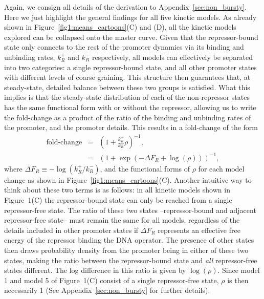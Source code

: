 Again, we consign all details of the derivation to
Appendix~\ref{sec:non_bursty}. Here we just highlight the general findings for
all five kinetic models. As already shown in Figure~\ref{fig1:means_cartoons}(C)
and (D), all the kinetic models explored can be collapsed onto the master curve.
Given that the repressor-bound state only connects to the rest of the promoter
dynamics via its binding and unbinding rates, $k_R^+$ and $k_R^-$ respectively,
all models can effectively be separated into two categories: a single
repressor-bound state, and all other promoter states with different levels of
coarse graining. This structure then guarantees that, at steady-state, detailed
balance between these two groups is satisfied. What this implies is that the
steady-state distribution of each of the non-repressor states has the same
functional form with or without the repressor, allowing us to write the
fold-change as a product of the ratio of the binding and unbinding rates of the
promoter, and the promoter details. This results in a fold-change of the form
\begin{eqnarray}
 \text{fold-change} &=& \left( 1 + \frac{k_R^+}{k_R^-} \rho \right)^{-1},\\
&=& (1 + \exp(-\Delta F_R + \log(\rho) ))^{-1},
\end{eqnarray}
where $\Delta F_R \equiv -\log(k_R^+/k_R^-)$, and the functional forms of $\rho$
for each model change as shown in Figure~\ref{fig1:means_cartoons}(C). Another
intuitive way to think about these two terms is as follows: in all kinetic
models shown in Figure~1(C) the repressor-bound state can only be reached from a
single repressor-free state. The ratio of these two states --repressor-bound and
adjacent repressor-free state-- must remain the same for all models, regardless
of the details included in other promoter states if $\Delta F_R$ represents an
effective free energy of the repressor binding the DNA operator. The presence of
other states then draws probability density from the promoter being in either of
these two states, making the ratio between the repressor-bound state and
\textit{all} repressor-free states different. The log difference in this ratio
is given by $\log(\rho)$. Since model 1 and model 5 of Figure~1(C) consist of a
single repressor-free state, $\rho$ is then necessarily 1 (See
Appendix~\ref{sec:non_bursty} for further details).

